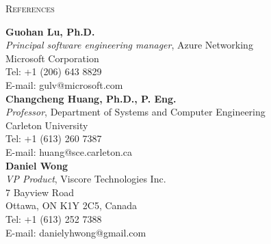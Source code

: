 \documentclass[letterpaper,11pt]{article}
\newcommand{\resheading}[1]{{\noindent\large \colorbox{mygrey}{
\begin{minipage}{1.0\textwidth}{\textsc{#1 \vphantom{p\^{E}}}}\end{minipage}}}}
\begin{document}
\begin{CJK}{UTF8}{gbsn}
\resheading{References}%

\leftskip 0.2in %


%
%
\vspace{0.2in}%
\textbf{Guohan Lu, Ph.D.}\\
\textit{Principal software engineering manager}, Azure Networking\\
Microsoft Corporation\\
Tel: +1 (206) 643 8829\\
E-mail: gulv@microsoft.com\\


\vspace{0.2in}%
\textbf{Changcheng Huang, Ph.D., P. Eng.}\\
\textit{Professor}, Department of Systems and Computer Engineering\\
Carleton University\\
Tel: +1 (613) 260 7387\\
E-mail: huang@sce.carleton.ca\\



\vspace{0.2in}%
\textbf{Daniel Wong}\\
\textit{VP Product}, Viscore Technologies Inc.\\
7 Bayview Road\\
Ottawa, ON K1Y 2C5, Canada\\
Tel: +1 (613) 252 7388\\
E-mail: danielyhwong@gmail.com\\



\end{CJK}
\end{document}
